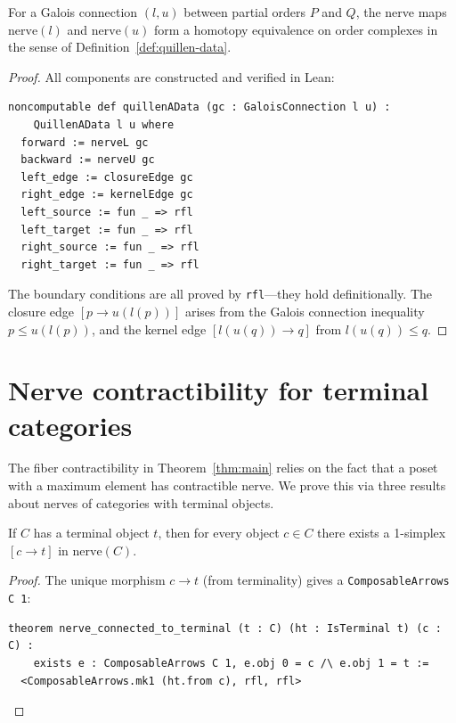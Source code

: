 \documentclass[11pt]{article}
\newcommand{\nerve}{\mathrm{nerve}}
\begin{document}
\begin{theorem}\label{thm:main}
For a Galois connection $(l, u)$ between partial orders $P$ and $Q$, the
nerve maps $\nerve(l)$ and $\nerve(u)$ form a homotopy equivalence on order
complexes in the sense of Definition~\ref{def:quillen-data}.
\end{theorem}

\begin{proof}
All components are constructed and verified in Lean:
\begin{lstlisting}
noncomputable def quillenAData (gc : GaloisConnection l u) :
    QuillenAData l u where
  forward := nerveL gc
  backward := nerveU gc
  left_edge := closureEdge gc
  right_edge := kernelEdge gc
  left_source := fun _ => rfl
  left_target := fun _ => rfl
  right_source := fun _ => rfl
  right_target := fun _ => rfl
\end{lstlisting}
The boundary conditions are all proved by \texttt{rfl}---they hold
definitionally. The closure edge $[p \to u(l(p))]$ arises from the Galois
connection inequality $p \le u(l(p))$, and the kernel edge $[l(u(q)) \to q]$
from $l(u(q)) \le q$.
\end{proof}

\section{Nerve contractibility for terminal categories}\label{sec:nerve}

The fiber contractibility in Theorem~\ref{thm:main} relies on the fact that
a poset with a maximum element has contractible nerve. We prove this via three
results about nerves of categories with terminal objects.

\begin{theorem}[Connectivity]\label{thm:connected}
If $C$ has a terminal object $t$, then for every object $c \in C$ there
exists a 1-simplex $[c \to t]$ in $\nerve(C)$.
\end{theorem}

\begin{proof}
The unique morphism $c \to t$ (from terminality) gives a
\texttt{ComposableArrows C 1}:
\begin{lstlisting}
theorem nerve_connected_to_terminal (t : C) (ht : IsTerminal t) (c : C) :
    exists e : ComposableArrows C 1, e.obj 0 = c /\ e.obj 1 = t :=
  <ComposableArrows.mk1 (ht.from c), rfl, rfl>
\end{lstlisting}
\end{proof}
\end{document}
